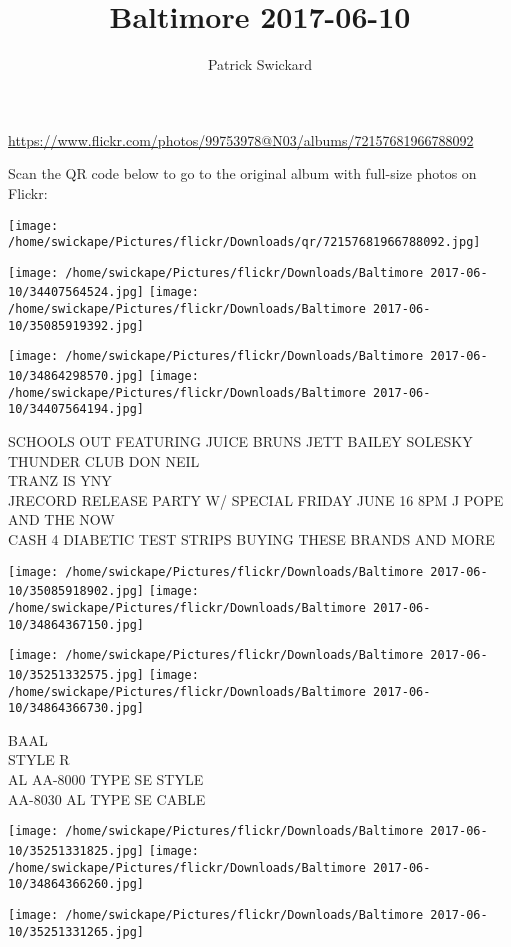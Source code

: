 \documentclass[10pt,letterpaper]{article}
\title{Baltimore 2017-06-10}
\author{Patrick Swickard}
\date{}
\begin{document}
\maketitle

\url{https://www.flickr.com/photos/99753978@N03/albums/72157681966788092}

Scan the QR code below to go to the original album with full-size photos on Flickr:

\texttt{[image: /home/swickape/Pictures/flickr/Downloads/qr/72157681966788092.jpg]}
\pagebreak

\texttt{[image: /home/swickape/Pictures/flickr/Downloads/Baltimore 2017-06-10/34407564524.jpg]}
\texttt{[image: /home/swickape/Pictures/flickr/Downloads/Baltimore 2017-06-10/35085919392.jpg]}

\texttt{[image: /home/swickape/Pictures/flickr/Downloads/Baltimore 2017-06-10/34864298570.jpg]}
\texttt{[image: /home/swickape/Pictures/flickr/Downloads/Baltimore 2017-06-10/34407564194.jpg]}

SCHOOLS OUT FEATURING JUICE BRUNS JETT BAILEY SOLESKY THUNDER CLUB DON NEIL\\
TRANZ IS YNY\\
JRECORD RELEASE PARTY W/ SPECIAL FRIDAY JUNE 16 8PM J POPE AND THE NOW\\
CASH 4 DIABETIC TEST STRIPS BUYING THESE BRANDS AND MORE
\pagebreak

\texttt{[image: /home/swickape/Pictures/flickr/Downloads/Baltimore 2017-06-10/35085918902.jpg]}
\texttt{[image: /home/swickape/Pictures/flickr/Downloads/Baltimore 2017-06-10/34864367150.jpg]}

\texttt{[image: /home/swickape/Pictures/flickr/Downloads/Baltimore 2017-06-10/35251332575.jpg]}
\texttt{[image: /home/swickape/Pictures/flickr/Downloads/Baltimore 2017-06-10/34864366730.jpg]}

BAAL\\
STYLE R\\
AL AA{-}8000 TYPE SE STYLE\\
AA{-}8030 AL TYPE SE CABLE
\pagebreak

\texttt{[image: /home/swickape/Pictures/flickr/Downloads/Baltimore 2017-06-10/35251331825.jpg]}
\texttt{[image: /home/swickape/Pictures/flickr/Downloads/Baltimore 2017-06-10/34864366260.jpg]}

\vspace{0.25in}
\texttt{[image: /home/swickape/Pictures/flickr/Downloads/Baltimore 2017-06-10/35251331265.jpg]}
\end{document}
